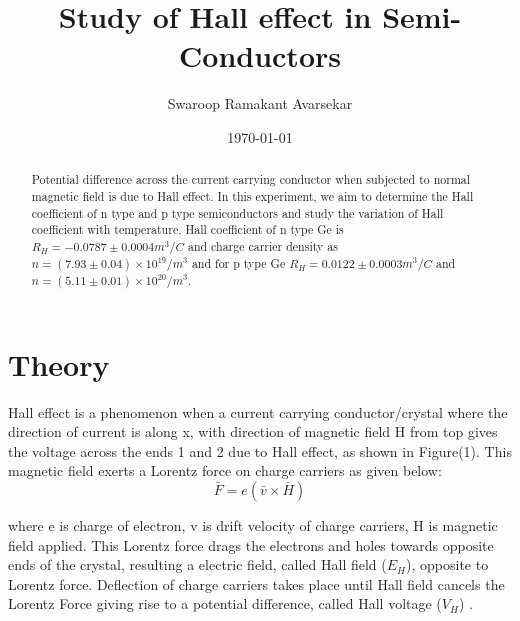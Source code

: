 \documentclass[a4paper, amsfonts, amssymb, amsmath, reprint, showkeys, nofootinbib, twoside]{revtex4-1}
\begin{document}
\title{Study of Hall effect in Semi-Conductors}
\author{Swaroop Ramakant Avarsekar}
\date{\today}
	
\begin{abstract}
Potential difference across the current carrying conductor when subjected to normal magnetic field is due to Hall effect. In this experiment,  we aim to determine the Hall coefficient of n type and p type semiconductors and study the variation of Hall coefficient with temperature. Hall coefficient of n type Ge is $R_H=-0.0787\pm0.0004 m^3/C$ and charge carrier density as $n=(7.93\pm0.04)\times10^{19}/m^3$ and for p type Ge $R_H=0.0122\pm0.0003 m^3/C$ and $n=(5.11\pm0.01)\times10^{20}/m^3$.
\end{abstract}
	
	
\maketitle

\section{Theory}
Hall effect is a phenomenon when a current carrying conductor/crystal where the direction of current is along x, with direction of magnetic field H from top gives the voltage across the ends 1 and 2 due to Hall effect, as shown in Figure(1). This magnetic field exerts a Lorentz force on charge carriers as given below:
\begin{equation}
	\bar{F}=e(\bar{v}\times\bar{H})
\end{equation}

where e is charge of electron, v is drift velocity of charge carriers, H is magnetic field applied. This Lorentz force drags the electrons and holes towards opposite ends of the crystal, resulting a electric field, called Hall field ($E_H$), opposite to Lorentz force. Deflection of charge carriers takes place until Hall field cancels the Lorentz Force giving rise to a potential difference, called Hall voltage ($V_H$) . 
\end{document}
